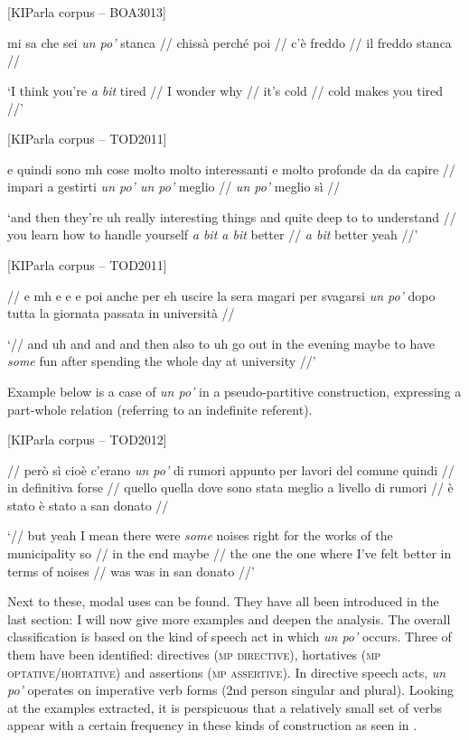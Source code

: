\ea%
    \label{ex:key:65}

          [KIParla corpus – BOA3013]

mi sa che sei \textit{un po’} stanca // chissà perché poi // c’è freddo // il freddo stanca //

\glt ‘I think you’re \textit{a bit} tired // I wonder why // it’s cold // cold makes you tired //’
\z

\ea%
    \label{ex:key:66}

          [KIParla corpus – TOD2011]

e quindi sono mh cose molto molto interessanti e molto profonde da da capire // impari a gestirti \textit{un po’ un po’} meglio // \textit{un po’} meglio sì //

\glt ‘and then they’re uh really interesting things and quite deep to to understand // you learn how to handle yourself \textit{a bit a bit} better // \textit{a bit} better yeah //’
\z


\ea%
    \label{ex:key:67}

          [KIParla corpus – TOD2011]

// e mh e e e poi anche per eh uscire la sera magari per svagarsi \textit{un po’} dopo tutta la giornata passata in università //

\glt ‘// and uh and and and then also to uh go out in the evening maybe to have \textit{some} fun after spending the whole day at university //’
\z

Example  below is a case of \textit{un po’} in a pseudo-partitive construction, expressing a part-whole relation (referring to an indefinite referent).

\ea%
    \label{ex:key:68}

          [KIParla corpus – TOD2012]

// però sì cioè c’erano \textit{un po’} di rumori appunto per lavori del comune quindi // in definitiva forse // quello quella dove sono stata meglio a livello di rumori // è stato è stato a san donato //

\glt ‘// but yeah I mean there were \textit{some} noises right for the works of the municipality so // in the end maybe // the one the one where I’ve felt better in terms of noises // was was in san donato //’
\z

Next to these, modal uses can be found. They have all been introduced in the last section: I will now give more examples and deepen the analysis. The overall classification is based on the kind of speech act in which \textit{un po’} occurs. Three of them have been identified: directives (\textsc{mp} \textsc{directive}), hortatives (\textsc{mp} \textsc{optative/hortative}) and assertions (\textsc{mp} \textsc{assertive}). In directive speech acts, \textit{un po’} operates on imperative verb forms (2nd person singular and plural). Looking at the examples extracted, it is perspicuous that a relatively small set of verbs appear with a certain frequency in these kinds of construction as seen in .

